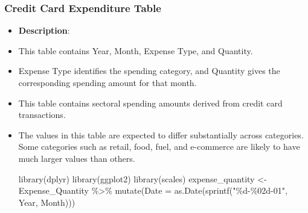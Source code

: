 \documentclass[
  11pt,
  a4paper,
  DIV=11,
  numbers=noendperiod]{scrartcl}
\newenvironment{Shaded}{\begin{snugshade}}{\end{snugshade}}
\newcommand{\AttributeTok}[1]{\textcolor[rgb]{0.40,0.45,0.13}{#1}}
\newcommand{\FunctionTok}[1]{\textcolor[rgb]{0.28,0.35,0.67}{#1}}
\newcommand{\NormalTok}[1]{\textcolor[rgb]{0.00,0.23,0.31}{#1}}
\newcommand{\OtherTok}[1]{\textcolor[rgb]{0.00,0.23,0.31}{#1}}
\newcommand{\SpecialCharTok}[1]{\textcolor[rgb]{0.37,0.37,0.37}{#1}}
\newcommand{\StringTok}[1]{\textcolor[rgb]{0.13,0.47,0.30}{#1}}
\begin{document}
\subsubsection{Credit Card Expenditure
Table}\label{credit-card-expenditure-table}

\begin{itemize}
\item
  \textbf{Description}:
\item
  This table contains Year, Month, Expense Type, and Quantity.\\
\item
  Expense Type identifies the spending category, and Quantity gives the
  corresponding spending amount for that month.
\item
  This table contains sectoral spending amounts derived from credit card
  transactions.
\item
  The values in this table are expected to differ substantially across
  categories. Some categories such as retail, food, fuel, and e-commerce
  are likely to have much larger values than others.

\begin{Shaded}
\begin{Highlighting}[]
\FunctionTok{library}\NormalTok{(dplyr)}
\FunctionTok{library}\NormalTok{(ggplot2)}
\FunctionTok{library}\NormalTok{(scales)}
\NormalTok{expense\_quantity }\OtherTok{\textless{}{-}}\NormalTok{ Expense\_Quantity }\SpecialCharTok{\%\textgreater{}\%}
  \FunctionTok{mutate}\NormalTok{(}\AttributeTok{Date =} \FunctionTok{as.Date}\NormalTok{(}\FunctionTok{sprintf}\NormalTok{(}\StringTok{"\%d{-}\%02d{-}01"}\NormalTok{, Year, Month)))}


\end{Highlighting}
\end{Shaded}
\end{itemize}
\end{document}
